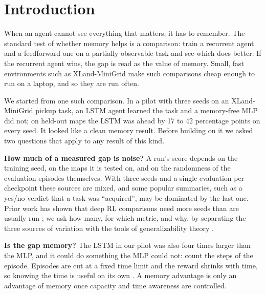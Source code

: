 \section{Introduction}
\label{sec:intro}

When an agent cannot see everything that matters, it has to remember. The standard test of
whether memory helps is a comparison: train a recurrent agent and a feedforward one on a partially
observable task and see which does better. If the recurrent agent wins, the gap is read as the
value of memory. Small, fast environments such as XLand-MiniGrid \citep{nikulin2024xland} make
such comparisons cheap enough to run on a laptop, and so they are run often.

We started from one such comparison. In a pilot with three seeds on an XLand-MiniGrid pickup task,
an LSTM agent learned the task and a memory-free MLP did not; on held-out maps the LSTM was ahead
by 17 to 42 percentage points on every seed. It looked like a clean memory result. Before building
on it we asked two questions that apply to any result of this kind.

\textbf{How much of a measured gap is noise?} A run's score depends on the training seed, on the
maps it is tested on, and on the randomness of the evaluation episodes themselves. With three
seeds and a single evaluation per checkpoint these sources are mixed, and some popular summaries,
such as a yes/no verdict that a task was ``acquired'', may be dominated by the last one. Prior
work has shown that deep RL comparisons need more seeds than are usually run
\citep{henderson2018matters,colas2018seeds,agarwal2021precipice,patterson2024empirical}; we ask
how many, for which metric, and why, by separating the three sources of variation with the
tools of generalizability theory \citep{cronbach1972dependability,brennan2001generalizability}.

\textbf{Is the gap memory?} The LSTM in our pilot was also four times larger than the MLP, and
it could do something the MLP could not: count the steps of the episode. Episodes are cut at a
fixed time limit and the reward shrinks with time, so knowing the time is useful on its own
\citep{pardo2018timelimits}. A memory advantage is only an advantage of memory once capacity and
time awareness are controlled.

